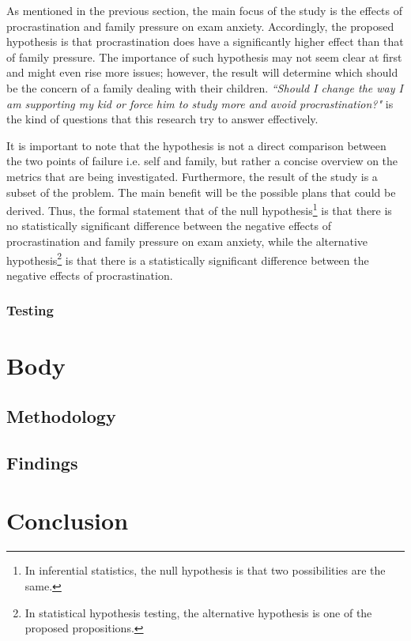 \documentclass[12pt]{report}
\begin{document}
As mentioned in the previous section, the main focus of the study is the effects
of procrastination and family pressure on exam anxiety. Accordingly, the
proposed hypothesis is that procrastination does have a significantly higher
effect than that of family pressure. The importance of such hypothesis may not
seem clear at first and might even rise more issues; however, the result will
determine which should be the concern of a family dealing with their children.
\textit{``Should I change the way I am supporting my kid or force him to study
more and avoid procrastination?"} is the kind of questions that this research
try to answer effectively.

It is important to note that the hypothesis is not a direct comparison between
the two points of failure i.e. self and family, but rather a concise overview on
the metrics that are being investigated. Furthermore, the result of the study is
a subset of the problem. The main benefit will be the possible plans that could
be derived. Thus, the formal statement that of the null hypothesis\footnote{In
inferential statistics, the null hypothesis is that two possibilities are the
same.} is that there is no statistically significant difference between the
negative effects of procrastination and family pressure on exam anxiety, while
the alternative hypothesis\footnote{In statistical hypothesis testing, the
alternative hypothesis is one of the proposed propositions.} is that there is a
statistically significant difference between the negative effects of
procrastination.

\subsection{Testing}

\chapter{Body}
\section{Methodology}

\lipsum

\section{Findings}

\lipsum

\chapter{Conclusion}
\end{document}
